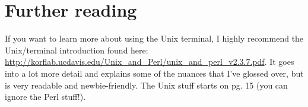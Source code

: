 \documentclass[english,12pt]{article}
\begin{document}
\section{Further reading}
If you want to learn more about using the Unix terminal, I highly recommend the Unix/terminal introduction found here: \url{http://korflab.ucdavis.edu/Unix_and_Perl/unix_and_perl_v2.3.7.pdf}. It goes into a lot more detail and explains some of the nuances that I've glossed over, but is very readable and newbie-friendly. The Unix stuff starts on pg. 15 (you can ignore the Perl stuff!).
\end{document}
